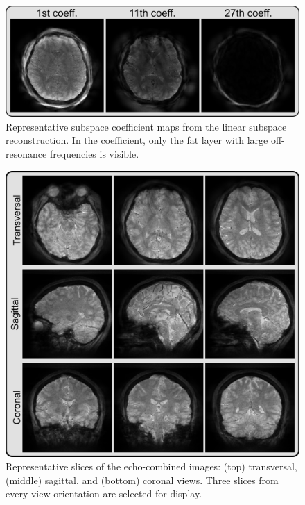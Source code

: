 \documentclass[a4paper,11pt]{article}
\def\InternRev{}
\begin{document}
\begin{figure}[H]
	\centering
\ifdefined\InternRev
	\includegraphics[width=\textwidth]{../figures/fig2.png}
\fi
	\caption{Representative subspace coefficient maps 
		from the linear subspace reconstruction. 
		In the  coefficient, 
		only the fat layer with large off-resonance frequencies is visible.}
	\label{FIG:BasisCoef}
\end{figure}

\ifdefined\InternRev
\pagebreak
\fi

\begin{figure}[H]
	\centering
\ifdefined\InternRev
	\includegraphics[width=\textwidth]{../figures/fig3.png}
\fi
	\caption{Representative slices of the echo-combined images: 
		(top) transversal, (middle) sagittal, and (bottom) coronal views.
		Three slices from every view orientation are selected for display.}
	\label{FIG:3DBrain}
\end{figure}
\end{document}
